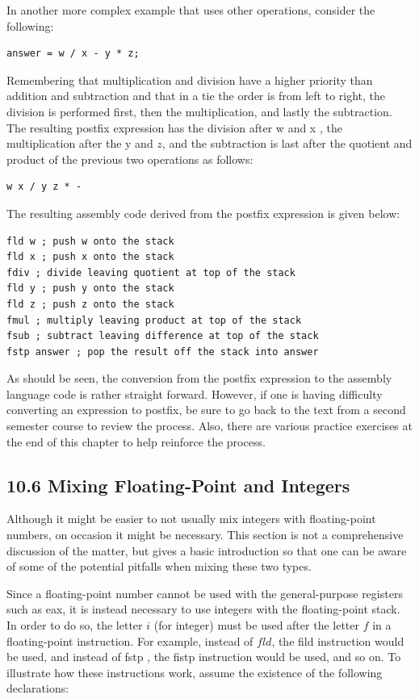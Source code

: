 \documentclass[10pt]{article}
\begin{document}
In another more complex example that uses other operations, consider the following:

\begin{verbatim}
answer = w / x - y * z;
\end{verbatim}

Remembering that multiplication and division have a higher priority than addition and subtraction and that in a tie the order is from left to right, the division is performed first, then the multiplication, and lastly the subtraction. The resulting postfix expression has the division after w and x , the multiplication after the y and $z$, and the subtraction is last after the quotient and product of the previous two operations as follows:

\begin{verbatim}
w x / y z * -
\end{verbatim}

The resulting assembly code derived from the postfix expression is given below:

\begin{verbatim}
fld w ; push w onto the stack
fld x ; push x onto the stack
fdiv ; divide leaving quotient at top of the stack
fld y ; push y onto the stack
fld z ; push z onto the stack
fmul ; multiply leaving product at top of the stack
fsub ; subtract leaving difference at top of the stack
fstp answer ; pop the result off the stack into answer
\end{verbatim}

As should be seen, the conversion from the postfix expression to the assembly language code is rather straight forward. However, if one is having difficulty converting an expression to postfix, be sure to go back to the text from a second semester course to review the process. Also, there are various practice exercises at the end of this chapter to help reinforce the process.

\subsection*{10.6 Mixing Floating-Point and Integers}
Although it might be easier to not usually mix integers with floating-point numbers, on occasion it might be necessary. This section is not a comprehensive discussion of the matter, but gives a basic introduction so that one can be aware of some of the potential pitfalls when mixing these two types.

Since a floating-point number cannot be used with the general-purpose registers such as eax, it is instead necessary to use integers with the floating-point stack. In order to do so, the letter $i$ (for integer) must be used after the letter $f$ in a floating-point instruction. For example, instead of $f l d$, the fild instruction would be used, and instead of fstp , the fistp instruction would be used, and so on. To illustrate how these instructions work, assume the existence of the following declarations:
\end{document}
